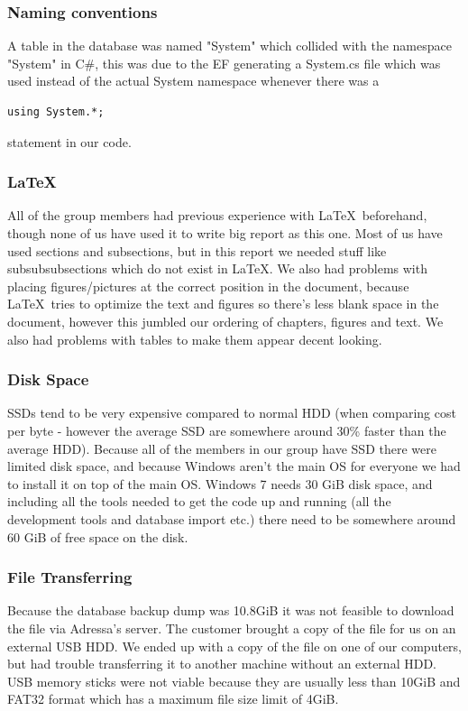 \subsubsection{Naming conventions}
A table in the database was named "System" which collided with the namespace "System" in C\#, this was due to the EF generating a System.cs file which was used instead of the actual System namespace whenever there was a 
\begin{lstlisting}
using System.*;
\end{lstlisting}
statement in our code.

\subsubsection{\LaTeX}
All of the group members had previous experience with \LaTeX \ beforehand, though none of us have used it to write big report as this one. Most of us have used sections and subsections, but in this report we needed stuff like subsubsubsections which do not exist in \LaTeX . We also had problems with placing figures/pictures at the correct position in the document, because \LaTeX \ tries to optimize the text and figures so there's less blank space in the document, however this jumbled our ordering of chapters, figures and text. We also had problems with tables to make them appear decent looking.


\subsubsection{Disk Space}
SSDs tend to be very expensive compared to normal HDD (when comparing cost per byte - however the average SSD are somewhere around 30\% faster than the average HDD). 
Because all of the members in our group have SSD there were limited disk space, and because Windows aren't the main OS for everyone we had to install it on top of the main OS. Windows 7 needs 30 GiB disk space, and including all the tools needed to get the code up and running (all the development tools and database import etc.) there need to be somewhere around 60 GiB of free space on the disk.

\subsubsection{File Transferring}
Because the database backup dump was 10.8GiB it was not feasible to download the file via Adressa's server. The customer brought a copy of the file for us on an external USB HDD. We ended up with a copy of the file on one of our computers, but had trouble transferring it to another machine without an external HDD. USB memory sticks were not viable because they are usually less than 10GiB and FAT32 format which has a maximum file size limit of 4GiB. 

